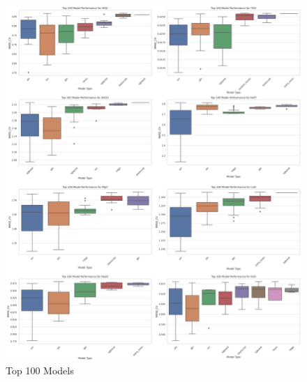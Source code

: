 \begin{figure}
    \centering
    \includegraphics[width=\textwidth]{images/top100/models.png}
    \caption{Top 100 Models}
    \label{fig:top100_models}
\end{figure}

